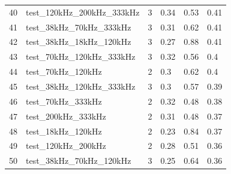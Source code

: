 \begin{longtable}{llllll}
40                     & test\_120kHz\_200kHz\_333kHz                      & 3                        & 0.34                           & 0.53                        & 0.41                           \\
41                     & test\_38kHz\_70kHz\_333kHz                        & 3                        & 0.31                           & 0.62                        & 0.41                           \\
42                     & test\_38kHz\_18kHz\_120kHz                        & 3                        & 0.27                           & 0.88                        & 0.41                           \\
43                     & test\_70kHz\_120kHz\_333kHz                       & 3                        & 0.32                           & 0.56                        & 0.4                            \\
44                     & test\_70kHz\_120kHz                               & 2                        & 0.3                            & 0.62                        & 0.4                            \\
45                     & test\_38kHz\_120kHz\_333kHz                       & 3                        & 0.3                            & 0.57                        & 0.39                           \\
46                     & test\_70kHz\_333kHz                               & 2                        & 0.32                           & 0.48                        & 0.38                           \\
47                     & test\_200kHz\_333kHz                              & 2                        & 0.31                           & 0.48                        & 0.37                           \\
48                     & test\_18kHz\_120kHz                               & 2                        & 0.23                           & 0.84                        & 0.37                           \\
49                     & test\_120kHz\_200kHz                              & 2                        & 0.28                           & 0.51                        & 0.36                           \\
50                     & test\_38kHz\_70kHz\_120kHz                        & 3                        & 0.25                           & 0.64                        & 0.36                           \\

\end{longtable}
